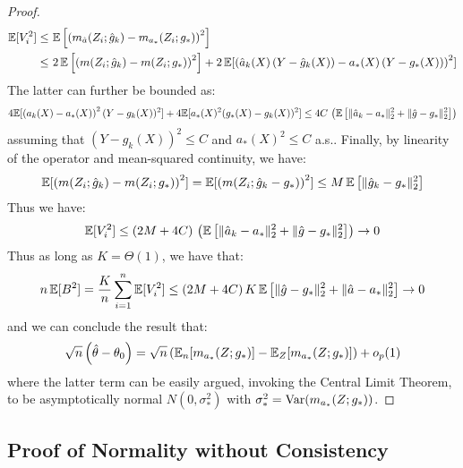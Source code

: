 \begin{proof}
\begin{align}
    \mathbb{E}[V_i^2] \leq~& \mathbb{E}\left[\left(m_{\hat{a}}(Z_i; \hat{g}_k) - m_{a_*}(Z_i; g_*)\right)^2\right] \\
    \leq~& 2\,\mathbb{E}\left[\left(m(Z_i; \hat{g}_k) - m(Z_i; g_*)\right)^2\right] + 2\, \mathbb{E}[\left(\hat{a}_k(X)\,(Y - \hat{g}_k(X)) - a_*(X)\,(Y-g_*(X))\right)^2]
\end{align}
The latter can further be bounded as:
\begin{align}
    4\mathbb{E}[\left(a_k(X) - a_*(X)\right)^2 (Y-g_k(X))^2] + 4\mathbb{E}[a_*(X)^2 (g_*(X) - g_k(X))^2] \leq 4 C\, \left(\mathbb{E}\left[\|\hat{a}_k - a_*\|_2^2 + \|\hat{g} - g_*\|_2^2\right]\right)
\end{align}
assuming that $(Y-\hat{g}_k(X))^2 \leq C$ and $a_*(X)^2 \leq C$ a.s..
Finally, by linearity of the operator and mean-squared continuity, we have:
\begin{equation}
    \mathbb{E}[\left(m(Z_i; \hat{g}_k) - m(Z_i; g_*)\right)^2] = \mathbb{E}[\left(m(Z_i; \hat{g}_k - g_*)\right)^2] \leq M\, \mathbb{E}\left[\|\hat{g}_k - g_*\|_2^2\right]
\end{equation}
Thus we have:
\begin{equation}
    \mathbb{E}[V_i^2] \leq (2M + 4C)\, \left(\mathbb{E}\left[\|\hat{a}_k - a_*\|_2^2 + \|\hat{g} - g_*\|_2^2\right]\right) \to 0
\end{equation}
Thus as long as $K = \Theta(1)$, we have that:
\begin{equation}\label{eqn:crucial-normality}
    n\, \mathbb{E}[B^2] = \frac{K}{n} \sum_{i=1}^n \mathbb{E}[V_i^2] \leq (2M + 4C)\, K\, \mathbb{E}\left[\|\hat{g}-g_*\|_2^2 + \|\hat{a}-a_*\|_2^2\right] \to 0
\end{equation}
and we can conclude the result that:
\begin{align}
    \sqrt{n}\left(\hat{\theta} - \theta_0\right) = \sqrt{n} \left(\mathbb{E}_n[m_{a_*}(Z; g_*)] - \mathbb{E}_Z[m_{a_*}(Z; g_*)]\right) + o_p(1)
\end{align}
where the latter term can be easily argued, invoking the Central Limit Theorem, to be asymptotically normal $N(0, \sigma_*^2)$ with $\sigma_*^2 =\text{Var}(m_{a_*}(Z; g_*))$.
\end{proof}


\subsection{Proof of Normality without Consistency}\label{sec:inconsistent}

